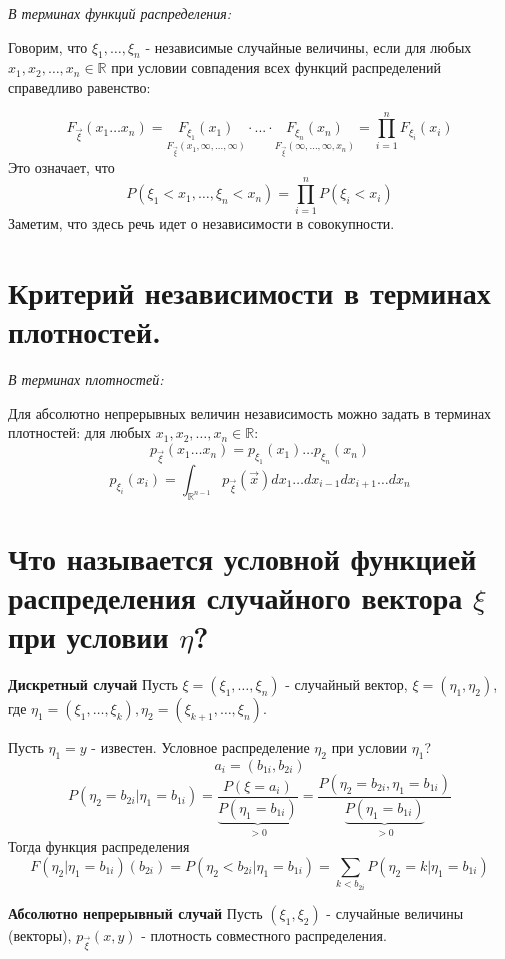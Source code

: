 \textit{В терминах функций распределения:}

Говорим, что $\xi_1, \dots, \xi_n$ - независимые случайные величины, если для любых $x_1, x_2, \dots, x_n \in \mathbb{R}$ при условии совпадения всех функций распределений справедливо равенство:

\[ F_{\vec{\xi}} (x_1 \dots x_n) = \underset{F_{\vec{\xi}}(x_1, \infty, \dots, \infty)}{F_{\xi_1}(x_1)} \cdot ... \cdot \underset{F_{\vec{\xi}}(\infty, \dots, \infty, x_n)}{F_{\xi_n}(x_n)} = \prod_{i=1}^{n} F_{\xi_i} (x_i) \]
Это означает, что
\[ P(\xi_1 < x_1, \dots, \xi_n < x_n) = \prod_{i=1}^{n} P(\xi_i < x_i) \]
Заметим, что здесь речь идет о независимости в совокупности.

\section{Критерий независимости в терминах плотностей.}

\textit{В терминах плотностей:}

Для абсолютно непрерывных величин независимость можно задать в терминах плотностей: для любых $x_1, x_2, \dots, x_n \in \mathbb{R}$:
\[ p_{\vec{\xi}} (x_1 \dots x_n) = p_{\xi_1} (x_1) \dots p_{\xi_n} (x_n) \]
\[ p_{\xi_i} (x_i) = \int_{\mathbb{R}^{n-1}} p_{\vec{\xi}} (\vec{x}) dx_1 \dots dx_{i-1} dx_{i+1} \dots dx_n \]

\section{Что называется условной функцией распределения случайного вектора $\xi$ при условии $\eta$?}

\noindent \textbf{Дискретный случай}
Пусть $\xi = (\xi_1,\dots,\xi_n)$ - случайный вектор, $\xi = (\eta_1, \eta_2)$, где $\eta_1=(\xi_1,\dots,\xi_k), \eta_2=(\xi_{k+1},\dots,\xi_n)$.

Пусть $\eta_1=y$ - известен. Условное распределение $\eta_2$ при условии $\eta_1$?
\[a_i=(b_{1i}, b_{2i})\]
\[P(\eta_2=b_{2i} | \eta_1=b_{1i})=\dfrac{P(\xi=a_i)}{\underbrace{P(\eta_1=b_{1i})}_{>0}} = \dfrac{P(\eta_2=b_{2i}, \eta_1=b_{1i})}{\underbrace{P(\eta_1=b_{1i})}_{>0}} \]
Тогда функция распределения
\[F(\eta_2 | \eta_1 = b_{1i})(b_{2i}) = P(\eta_2 < b_{2i} | \eta_1=b_{1i}) =  \sum\limits_{k<b_{2i}} P(\eta_2 = k | \eta_1=b_{1i})\]


\noindent \textbf{Абсолютно непрерывный случай}
Пусть $(\xi_1, \xi_2)$ - случайные величины (векторы), $p_{\vec{\xi}}(x,y)$ - плотность совместного распределения.

